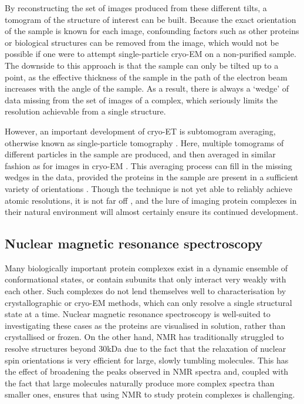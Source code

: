 \documentclass[a4paper,11pt,twoside,openright]{scrbook}
\begin{document}
By reconstructing the set of images produced from these different tilts, a tomogram of the structure of interest can be built. Because the exact orientation of the sample is known for each image, confounding factors such as other proteins or biological structures can be removed from the image, which would not be possible if one were to attempt single-particle cryo-EM on a non-purified sample. The downside to this approach is that the sample can only be tilted up to a point, as the effective thickness of the sample in the path of the electron beam increases with the angle of the sample. As a result, there is always a `wedge' of data missing from the set of images of a complex, which seriously limits the resolution achievable from a single structure.

However, an important development of cryo-ET is subtomogram averaging, otherwise known as single-particle tomography \cite{Galaz-Montoya2017}. Here, multiple tomograms of different particles in the sample are produced, and then averaged in similar fashion as for images in cryo-EM \cite{Bharat2016}. This averaging process can fill in the missing wedges in the data, provided the proteins in the sample are present in a sufficient variety of orientations \cite{Leschziner2006}. Though the technique is not yet able to reliably achieve atomic resolutions, it is not far off \cite{Schur2016}, and the lure of imaging protein complexes in their natural environment will almost certainly ensure its continued development.

\subsection{Nuclear magnetic resonance spectroscopy}
Many biologically important protein complexes exist in a dynamic ensemble of conformational states, or contain subunits that only interact very weakly with each other. Such complexes do not lend themselves well to characterisation by crystallographic or cryo-EM methods, which can only resolve a single structural state at a time. Nuclear magnetic resonance spectroscopy is well-suited to investigating these cases as the proteins are visualised in solution, rather than crystallised or frozen. On the other hand, NMR has traditionally struggled to resolve structures beyond 30kDa due to the fact that the relaxation of nuclear spin orientations is very efficient for large, slowly tumbling molecules. This has the effect of broadening the peaks observed in NMR spectra and, coupled with the fact that large molecules naturally produce more complex spectra than smaller ones, ensures that using NMR to study protein complexes is challenging.
\end{document}
